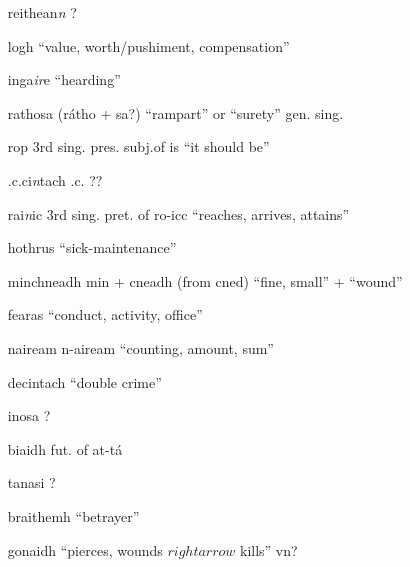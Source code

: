 \documentclass[11pt]{article}
\begin{document}
\begin{enumerate}
  \item[reithean\emph{n}] ?
  \item[logh] \enquote{value, worth/pushiment, compensation}
  \item[inga\emph{ir}e] \enquote{hearding}
  \item[rathosa] (r\'{a}tho + sa?) \enquote{rampart} or \enquote{surety} gen. sing.
  \item[rop] 3rd sing. pres. subj.of is \enquote{it should be}
  \item[.c.ci\emph{n}tach] .c. ??
  \item[rai\emph{n}ic] 3rd sing. pret. of ro-icc \enquote{reaches, arrives, attains}
  \item[hothrus] \enquote{sick-maintenance}
  \item[minchneadh] min + cneadh (from cned) \enquote{fine, small} + \enquote{wound}
  \item[fearas] \enquote{conduct, activity, office}
  \item[naiream] n-aiream \enquote{counting, amount, sum}
  \item[decintach] \enquote{double crime}
  \item[inosa] ?
  \item[biaidh] fut. of at-t\'{a}
  \item[tanasi] ?
  \item[braithemh] \enquote{betrayer}
  \item[gonaidh] \enquote{pierces, wounds $rightarrow$ kills} vn?
\end{enumerate}
\end{document}
